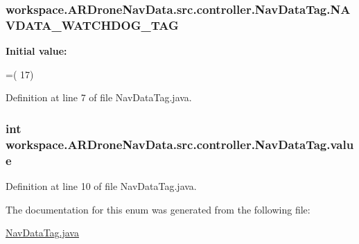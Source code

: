 \subsubsection[{N\+A\+V\+D\+A\+T\+A\+\_\+\+W\+A\+T\+C\+H\+D\+O\+G\+\_\+\+T\+A\+G}]{\setlength{\rightskip}{0pt plus 5cm}workspace.\+A\+R\+Drone\+Nav\+Data.\+src.\+controller.\+Nav\+Data\+Tag.\+N\+A\+V\+D\+A\+T\+A\+\_\+\+W\+A\+T\+C\+H\+D\+O\+G\+\_\+\+T\+A\+G}\label{enumworkspace_1_1_a_r_drone_nav_data_1_1src_1_1controller_1_1_nav_data_tag_ab8546ff051fed36a2fbdf64fa84a1e1a}
{\bfseries Initial value\+:}
\begin{DoxyCode}
=(
            17)
\end{DoxyCode}


Definition at line 7 of file Nav\+Data\+Tag.\+java.

\hypertarget{enumworkspace_1_1_a_r_drone_nav_data_1_1src_1_1controller_1_1_nav_data_tag_aba1c9c311ce6beec5dfadd83e5e0892a}{}
\subsubsection[{value}]{\setlength{\rightskip}{0pt plus 5cm}int workspace.\+A\+R\+Drone\+Nav\+Data.\+src.\+controller.\+Nav\+Data\+Tag.\+value\hspace{0.3cm}{\ttfamily [private]}}\label{enumworkspace_1_1_a_r_drone_nav_data_1_1src_1_1controller_1_1_nav_data_tag_aba1c9c311ce6beec5dfadd83e5e0892a}


Definition at line 10 of file Nav\+Data\+Tag.\+java.



The documentation for this enum was generated from the following file\+:\begin{DoxyCompactItemize}
\item 
\hyperlink{_nav_data_tag_8java}{Nav\+Data\+Tag.\+java}\end{DoxyCompactItemize}
